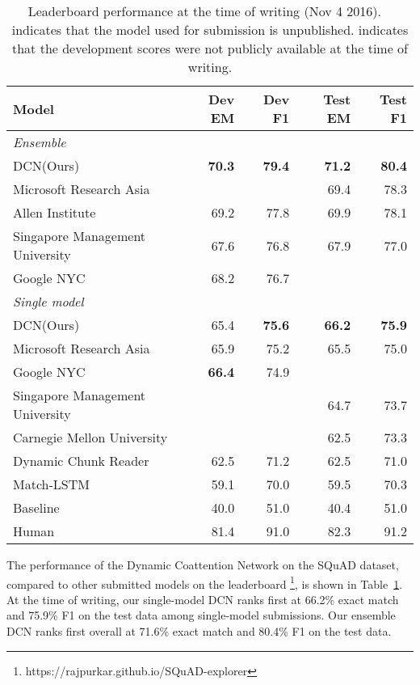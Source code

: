 \documentclass{article} \usepackage{iclr2017_conference,times}
\newcommand{\ours}{DCN\xspace}
\newcommand{\oursfull}{Dynamic Coattention Network\xspace}
\newcommand{\testem}{71.6}
\newcommand{\testemsingle}{66.2}
\newcommand{\testf}{80.4}
\newcommand{\testfsingle}{75.9}
\begin{document}
\newcommand{\unpublished}{}

\begin{table}[!t]
  \centering
  \begin{tabular}{lrrrr}
    \toprule
    Model & Dev EM & Dev F1 & Test EM & Test F1\\
    \midrule
    \textit{Ensemble} \\
    \ours (Ours)                   & \textbf{70.3}  & \textbf{79.4} & \textbf{71.2} & \textbf{80.4} \\
    Microsoft Research Asia \unpublished    &  &  & 69.4  & 78.3 \\
    Allen Institute	\unpublished			& 69.2  & 77.8 & 69.9 & 78.1 \\
    Singapore Management University \unpublished & 67.6  & 76.8 & 67.9 & 77.0 \\
    Google NYC \unpublished                     & 68.2  & 76.7 &  &  \\
    \midrule
    \textit{Single model} \\
    \ours (Ours)                   & 65.4  & \textbf{75.6} & \textbf{66.2} & \textbf{75.9} \\
    Microsoft Research Asia \unpublished    & 65.9  & 75.2 & 65.5 & 75.0 \\
    Google NYC \unpublished                     & \textbf{66.4}  & 74.9 &  &  \\
    Singapore Management University \unpublished &  &  & 64.7 & 73.7 \\
    Carnegie Mellon University \unpublished &  &  & 62.5 & 73.3 \\
    Dynamic Chunk Reader \citep{Yu2016}     & 62.5  & 71.2 & 62.5 & 71.0 \\
    Match-LSTM \citep{wang2016machine}      & 59.1  & 70.0 & 59.5 & 70.3 \\
    Baseline \citep{rajpurkar2016squad}     & 40.0  & 51.0 & 40.4 & 51.0 \\
    \midrule
    Human	\citep{rajpurkar2016squad}      & 81.4  & 91.0 & 82.3 & 91.2 \\
    \bottomrule
  \end{tabular}
  \caption{
Leaderboard performance at the time of writing (Nov 4 2016).
\unpublished~ indicates that the model used for submission is unpublished.
 indicates that the development scores were not publicly available at the time of writing.
}
\label{table:perf-leaderboard}
\end{table}

The performance of the \oursfull on the SQuAD dataset, compared to other submitted models on the leaderboard \footnote{https://rajpurkar.github.io/SQuAD-explorer}, is shown in Table~\ref{table:perf-leaderboard}.
At the time of writing, our single-model \ours ranks first at \testemsingle\% exact match and \testfsingle\% F1 on the test data among single-model submissions.
Our ensemble \ours ranks first overall at \testem\% exact match and \testf\% F1 on the test data.
\end{document}
